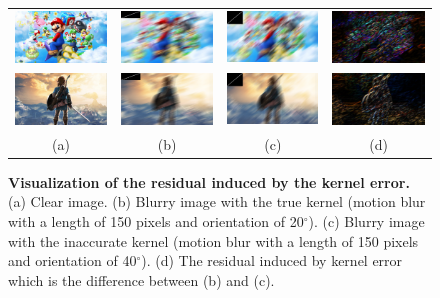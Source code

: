 \documentclass[10pt,twocolumn,letterpaper]{article}
\begin{document}
	\begin{figure}
		\centering
		\setlength\tabcolsep{1pt}
		\begin{tabular}{cccc}
			\includegraphics[width=0.24\linewidth]{mario2}&\includegraphics[width=0.24\linewidth]{marblurry1p}&\includegraphics[width=0.24\linewidth]{marblurry2p}&\includegraphics[width=0.24\linewidth]{res1}\\
			\includegraphics[width=0.24\linewidth]{zelda2}&\includegraphics[width=0.24\linewidth]{zelblurry1p}&\includegraphics[width=0.24\linewidth]{zelblurry2p}&\includegraphics[width=0.24\linewidth]{res2}\\
			(a)&(b)&(c)&(d)
		\end{tabular}
		\caption{\textbf{Visualization of the residual induced by the kernel error.} (a) Clear image. (b) Blurry image with the true kernel (motion blur with a length of 150 pixels and orientation of 20$^\circ$). (c) Blurry image with the inaccurate kernel (motion blur with a length of 150 pixels and orientation of 40$^\circ$). (d) The residual induced by kernel error which is the difference between (b) and (c).}
		\label{fig:2}
	\end{figure}
\end{document}
